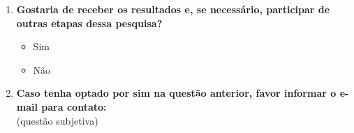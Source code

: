 \begin{enumerate}[label=\bf A\arabic*,leftmargin=1.8cm]
    \begin{enumerate}[label= \arabic*]
     
     \item \textbf{Gostaria de receber os resultados e, se necessário, participar de outras etapas dessa pesquisa?}
     \begin{itemize}
        \item Sim
        \item Não
    \end {itemize}
    
    \item \textbf{Caso tenha optado por sim na questão anterior, favor informar o e-mail para contato:}\\
    (questão subjetiva)
     
    \end{enumerate}
    
\end{enumerate}


